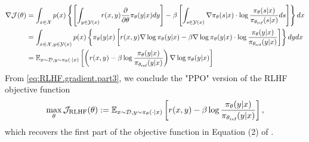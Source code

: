 \begin{align}\label{eq:RLHF.gradient.part3}
\nabla {\cal J}(\theta)
 & = \int_{x\in {\cal X}} p(x)\left\{\left[\int_{y\in{\cal Y}(x)}r(x,y)\frac{\partial}{\partial \theta}\pi_{\theta}(y|x)dy\right] - \beta \left[\int_{s\in{\cal Y}(x)}\nabla\pi_{\theta}(s|x)\cdot\log\frac{\pi_{\theta}(s|x)}{\pi_{\theta_{\text{ref}}}(s|x)} ds\right] \right\}dx \nonumber\\
 & = \int_{x\in {\cal X}, y\in{\cal Y}(x)} p(x)\left\{ \pi_{\theta}(y|x) \left[ r(x,y)\nabla\log \pi_{\theta}(y|x) - \beta\nabla\log\pi_{\theta}(y|x)\cdot\log\frac{\pi_{\theta}(y|x)}{\pi_{\theta_{\text{ref}}}(y|x)}\right]  \right\}dydx \nonumber\\
 & = \mathbb{E}_{x\sim {\cal D}, y\sim\pi_{\theta}(\cdot|x)}\left[\left(r(x,y) - \beta\log\frac{\pi_{\theta}(y|x)}{\pi_{\theta_{\text{ref}}}(y|x)}\right)\nabla\log\pi_{\theta}(y|x)\right]
\end{align}
From \eqref{eq:RLHF.gradient.part3}, we conclude the "PPO" version of the RLHF objective function
\begin{align}\label{eq:rlhf.obj}
  \max_{\theta} {\cal J}_{\text{RLHF}}(\theta):=\mathbb{E}_{x\sim {\cal D}, y\sim\pi_{\theta}(\cdot|x)}\left[r(x,y) - \beta\log\frac{\pi_{\theta}(y|x)}{\pi_{\theta_{\text{ref}}}(y|x)}\right],
\end{align}
which recovers the first part of the objective function in Equation (2) of \citet{ouyang2022training}.